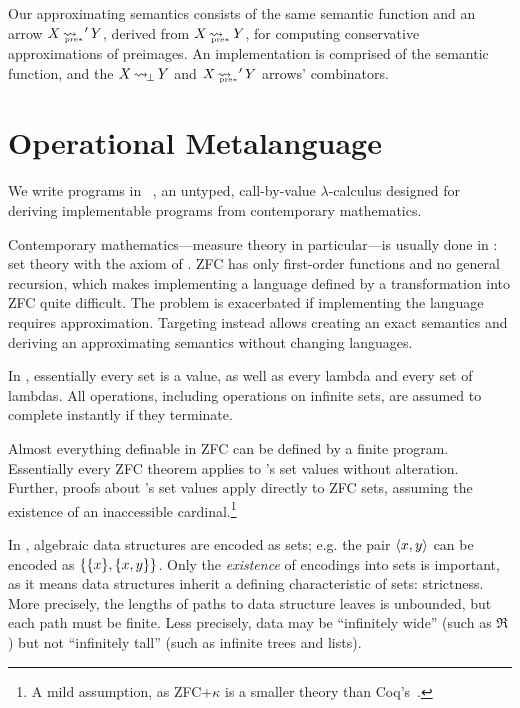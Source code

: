 \documentclass{llncs}
\newcommand{\arrow}{\rightsquigarrow}
\DeclareMathOperator{\botto}{\arrow_{\mspace{-3mu}\bot}}
\DeclareMathOperator{\ppreto}{\arrow_{\mspace{-19mu}_{\mathrm{pre*}}}}
\begin{document}
Our approximating semantics consists of the same semantic function and an arrow $X \ppreto' Y$, derived from $X \ppreto Y$, for computing conservative approximations of preimages.
An implementation is comprised of the semantic function, and the $X \botto Y$ and $X \ppreto' Y$ arrows' combinators.


\section{Operational Metalanguage}

We write programs in \lzfclang~\cite{cit:toronto-2012flops-lzfc}, an untyped, call-by-value $\lambda$-calculus designed for deriving implementable programs from contemporary mathematics.

Contemporary mathematics---measure theory in particular---is usually done in :  set theory with the axiom of .
ZFC has only first-order functions and no general recursion, which makes implementing a language defined by a transformation into ZFC quite difficult.
The problem is exacerbated if implementing the language requires approximation.
Targeting \lzfclang instead allows creating an exact semantics and deriving an approximating semantics without changing languages.

In \lzfclang, essentially every set is a value, as well as every lambda and every set of lambdas.
All operations, including operations on infinite sets, are assumed to complete instantly if they terminate.

Almost everything definable in ZFC can be defined by a finite \lzfclang program.
Essentially every ZFC theorem applies to \lzfclang's set values without alteration.
Further, proofs about \lzfclang's set values apply directly to ZFC sets, assuming the existence of an inaccessible cardinal.\footnote{A mild assumption, as ZFC+$\kappa$ is a smaller theory than Coq's~\cite{cit:barras-2010-sets-coq}.}

In \lzfclang, algebraic data structures are encoded as sets; e.g. the pair $\langle{x,y}\rangle$ can be encoded as $\{{\{{x}\},\{{x,y}\}}\}$.
Only the \emph{existence} of encodings into sets is important, as it means data structures inherit a defining characteristic of sets: strictness.
More precisely, the lengths of paths to data structure leaves is unbounded, but each path must be finite.
Less precisely, data may be ``infinitely wide'' (such as $\Re$) but not ``infinitely tall'' (such as infinite trees and lists).
\end{document}
